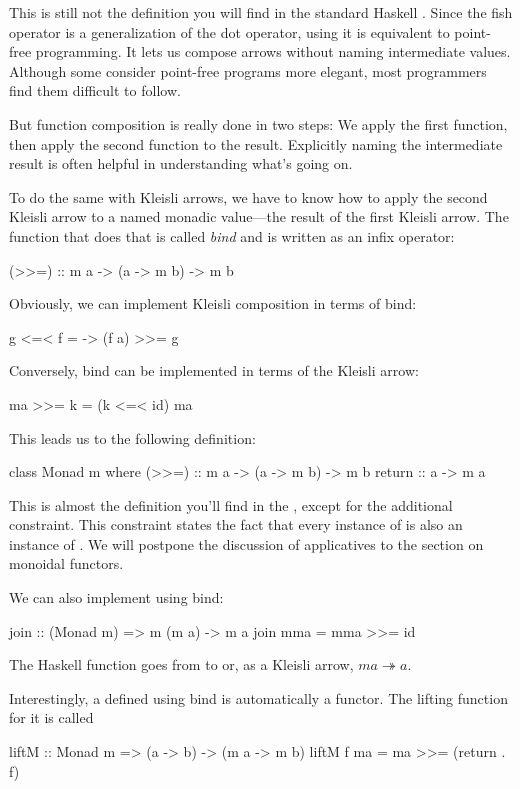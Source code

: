 \documentclass[DaoFP]{subfiles}
\begin{document}
This is still not the definition you will find in the standard Haskell . Since the fish operator is a generalization of the dot operator, using it is equivalent to point-free programming. It lets us compose arrows without naming intermediate values. Although some consider point-free programs more elegant, most programmers find them difficult to follow. 

But function composition is really done in two steps: We apply the first function, then apply the second function to the result. Explicitly naming the intermediate result is often helpful in understanding what's going on.

To do the same with Kleisli arrows, we have to know how to apply the second Kleisli arrow to a named monadic value---the result of the first Kleisli arrow. The function that does that is called \emph{bind} and is written as an infix operator:
\begin{haskell}
(>>=) :: m a -> (a -> m b) -> m b
\end{haskell}
Obviously, we can implement Kleisli composition in terms of bind:

\begin{haskell}
g <=< f = \a -> (f a) >>= g
\end{haskell}

Conversely, bind can be implemented in terms of the Kleisli arrow:
\begin{haskell}
ma >>= k = (k <=< id) ma
\end{haskell}

This leads us to the following definition:
\begin{haskell}
class Monad m where
  (>>=) :: m a -> (a -> m b) -> m b
  return :: a -> m a 
\end{haskell}
This is almost the definition you'll find in the , except for the additional constraint. This constraint states the fact that every instance of  is also an instance of . We will postpone the discussion of applicatives to the section on monoidal functors.

We can also implement  using bind:
\begin{haskell}
join  :: (Monad m) => m (m a) -> m a
join mma =  mma >>= id
\end{haskell}
The Haskell function  goes from  to  or, as a Kleisli arrow, $m a \twoheadrightarrow a$.

Interestingly, a  defined using bind is automatically a functor. The lifting function for it is called 
\begin{haskell}
liftM :: Monad m => (a -> b) -> (m a -> m b)
liftM f ma = ma >>= (return . f)
\end{haskell}
\end{document}
